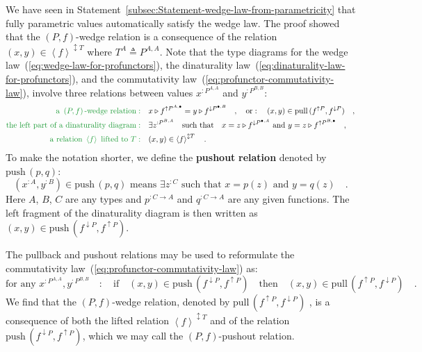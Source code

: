 We have seen in Statement~\ref{subsec:Statement-wedge-law-from-parametricity}
that fully parametric values automatically satisfy the wedge law.
The proof showed that the $\left(P,f\right)$-wedge relation is a
consequence of the relation $(x,y)\in\left<f\right>^{\updownarrow T}$
where $T^{A}\triangleq P^{A,A}$. Note that the type diagrams for
the wedge law~(\ref{eq:wedge-law-for-profunctors}), the dinaturality
law~(\ref{eq:dinaturality-law-for-profunctors}), and the commutativity
law~(\ref{eq:profunctor-commutativity-law}), involve three relations
between values $x^{:P^{A,A}}$ and $y^{:P^{B,B}}$:
\begin{align*}
{\color{greenunder}\text{a }\left(P,f\right)\text{-wedge relation}:}\quad & x\triangleright f^{\uparrow P^{A,\bullet}}=y\triangleright f^{\downarrow P^{\bullet,B}}\quad,\quad\text{or}:\quad(x,y)\in\text{pull}\,(f^{\uparrow P},f^{\downarrow P})\quad,\\
{\color{greenunder}\text{the left part of a dinaturality diagram}:}\quad & \exists z^{:P^{B,A}}\quad\text{such that}\quad x=z\triangleright f^{\downarrow P^{\bullet,A}}\text{ and }y=z\triangleright f^{\uparrow P^{B,\bullet}}\quad,\\
{\color{greenunder}\text{a relation }\left<f\right>\text{ lifted to }T:}\quad & (x,y)\in\left<f\right>^{\updownarrow T}\quad.
\end{align*}
To make the notation shorter, we define the \textbf{pushout} \textbf{relation}
denoted by $\text{push}\,(p,q)$:
\[
(x^{:A},y^{:B})\in\text{push}\,(p,q)\text{ means }\exists z^{:C}\text{ such that }x=p(z)\text{ and }y=q(z)\quad.
\]
Here $A$, $B$, $C$ are any types and $p^{:C\rightarrow A}$ and
$q^{:C\rightarrow A}$ are any given functions. The left fragment
of the dinaturality diagram is then written as $(x,y)\in\text{push}\,(f^{\downarrow P},f^{\uparrow P})$.

The pullback and pushout relations may be used to reformulate the
commutativity law~(\ref{eq:profunctor-commutativity-law}) as: 
\[
\text{for any }x^{:P^{A,A}},y^{:P^{B,B}}\quad:\quad\text{if}\quad(x,y)\in\text{push}\,(f^{\downarrow P},f^{\uparrow P})\quad\text{then}\quad(x,y)\in\text{pull}\,(f^{\uparrow P},f^{\downarrow P})\quad.
\]
We find that the $\left(P,f\right)$-wedge relation, denoted by $\text{pull}\,(f^{\uparrow P},f^{\downarrow P})$
, is a consequence of both the lifted relation $\left<f\right>^{\updownarrow T}$
and of the relation $\text{push}\,(f^{\downarrow P},f^{\uparrow P})$,
which we may call the $\left(P,f\right)$-pushout relation.

